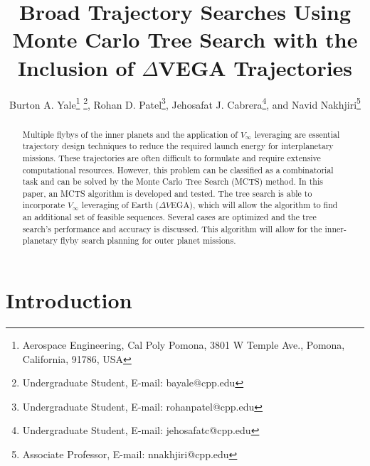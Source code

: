 \documentclass[letterpaper, paper,11pt]{AAS}	%
\begin{document}
\setcounter{page}{5199}

\title{Broad Trajectory Searches Using Monte Carlo Tree Search with the Inclusion of $\Delta$VEGA Trajectories}

\author{
    Burton A. Yale\thanks{Aerospace Engineering, Cal Poly Pomona, 3801 W Temple Ave., Pomona, California, 91786, USA}
        \thanks{Undergraduate Student, E-mail: bayale@cpp.edu},
    Rohan D. Patel\footnotemark[1]
        \thanks{Undergraduate Student, E-mail: rohanpatel@cpp.edu},
    Jehosafat J. Cabrera\footnotemark[1]
        \thanks{Undergraduate Student, E-mail: jehosafatc@cpp.edu},
    and Navid Nakhjiri\footnotemark[1]
        \thanks{Associate Professor, E-mail: nnakhjiri@cpp.edu}
}

\maketitle{}

\begin{abstract}
Multiple flybys of the inner planets and the application of $V_{\infty}$ leveraging are essential trajectory design techniques to reduce the required launch energy for interplanetary missions. These trajectories are often difficult to formulate and require extensive computational resources. However, this problem can be classified as a combinatorial task and can be solved by the Monte Carlo Tree Search (MCTS) method. In this paper, an MCTS algorithm is developed and tested. The tree search is able to incorporate $V_\infty$ leveraging of Earth ($\Delta V$EGA), which will allow the algorithm to find an additional set of feasible sequences. Several cases are optimized and the tree search's performance and accuracy is discussed. This algorithm will allow for the inner-planetary flyby search planning for outer planet missions.
\end{abstract}

\section*{Introduction}
\end{document}
